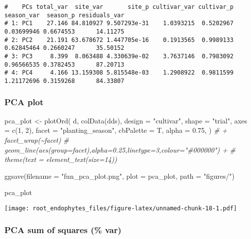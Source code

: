 \documentclass[
]{article}
\newenvironment{Shaded}{\begin{snugshade}}{\end{snugshade}}
\newcommand{\AttributeTok}[1]{\textcolor[rgb]{0.77,0.63,0.00}{#1}}
\newcommand{\CommentTok}[1]{\textcolor[rgb]{0.56,0.35,0.01}{\textit{#1}}}
\newcommand{\DecValTok}[1]{\textcolor[rgb]{0.00,0.00,0.81}{#1}}
\newcommand{\FloatTok}[1]{\textcolor[rgb]{0.00,0.00,0.81}{#1}}
\newcommand{\FunctionTok}[1]{\textcolor[rgb]{0.00,0.00,0.00}{#1}}
\newcommand{\NormalTok}[1]{#1}
\newcommand{\OtherTok}[1]{\textcolor[rgb]{0.56,0.35,0.01}{#1}}
\newcommand{\StringTok}[1]{\textcolor[rgb]{0.31,0.60,0.02}{#1}}
\begin{document}
\begin{verbatim}
#    PCs total_var  site_var       site_p cultivar_var cultivar_p season_var  season_p residuals_var
# 1: PC1    27.146 84.810927 9.507293e-31    1.0393215  0.5202967 0.03699946 0.6674553      14.11275
# 2: PC2    21.191 63.678672 1.447705e-16    0.1913565  0.9989133 0.62845464 0.2660247      35.50152
# 3: PC3     8.399  8.063488 4.330639e-02    3.7637146  0.7983092 0.96566535 0.3782453      87.20713
# 4: PC4     4.166 13.159308 5.815548e-03    1.2908922  0.9811599 1.21172696 0.3159268      84.33807
\end{verbatim}

\hypertarget{pca-plot}{%
\subsubsection{PCA plot}\label{pca-plot}}

\begin{Shaded}
\begin{Highlighting}[]
\NormalTok{pca\_plot }\OtherTok{\textless{}{-}} \FunctionTok{plotOrd}\NormalTok{(}
\NormalTok{  d,}
  \FunctionTok{colData}\NormalTok{(dds),}
  \AttributeTok{design =} \StringTok{"cultivar"}\NormalTok{,}
  \AttributeTok{shape =} \StringTok{"trial"}\NormalTok{,}
  \AttributeTok{axes =} \FunctionTok{c}\NormalTok{(}\DecValTok{1}\NormalTok{, }\DecValTok{2}\NormalTok{),}
  \AttributeTok{facet =} \StringTok{"planting\_season"}\NormalTok{, }
  \AttributeTok{cbPalette =}\NormalTok{ T,}
  \AttributeTok{alpha =} \FloatTok{0.75}\NormalTok{,}
\NormalTok{) }\CommentTok{\# + facet\_wrap(\textasciitilde{}facet) }
\CommentTok{\#   geom\_line(aes(group=facet),alpha=0.25,linetype=3,colour="\#000000") + }
\CommentTok{\#   theme(text = element\_text(size=14))}

\FunctionTok{ggsave}\NormalTok{(}\AttributeTok{filename =} \StringTok{"fun\_pca\_plot.png"}\NormalTok{, }\AttributeTok{plot =}\NormalTok{ pca\_plot, }\AttributeTok{path =} \StringTok{"figures/"}\NormalTok{)}

\NormalTok{pca\_plot}
\end{Highlighting}
\end{Shaded}

\texttt{[image: root\_endophytes\_files/figure-latex/unnamed-chunk-18-1.pdf]}

\hypertarget{pca-sum-of-squares-var}{%
\subsubsection{PCA sum of squares (\%
var)}\label{pca-sum-of-squares-var}}
\end{document}
